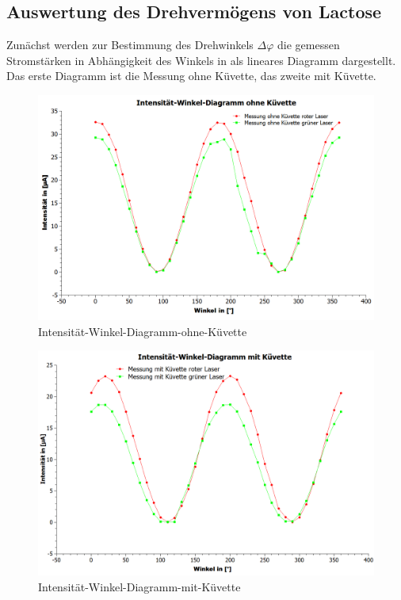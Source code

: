 \documentclass[fontsize=12pt]{scrartcl}
\begin{document}
\subsection{Auswertung des Drehvermögens von Lactose}
Zunächst werden zur Bestimmung des Drehwinkels $\Delta\varphi$ die gemessen Stromstärken in Abhängigkeit des Winkels in als lineares Diagramm 
dargestellt. Das erste Diagramm ist die Messung ohne Küvette, das zweite mit Küvette.
\begin{figure}[H]
\vspace{-12pt}
		\includegraphics[scale=0.4]{Graphik/Intensitats-Winkel-Diagramm-ohne-Kuvette}
		\vspace{-15pt}
		\caption{Intensität-Winkel-Diagramm-ohne-Küvette}
\end{figure}
\begin{figure}[H]
\vspace{-17pt}
        \includegraphics[scale=0.4]{Graphik/Intensitats-Winkel-Diagramm-mit-Kuvette}
        \vspace{-10pt}
		\caption{Intensität-Winkel-Diagramm-mit-Küvette}
\end{figure}
\end{document}
